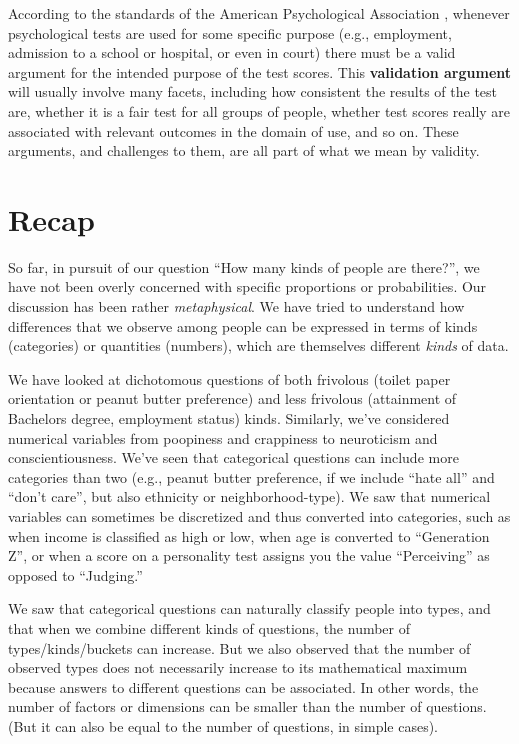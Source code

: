 \documentclass[openany]{book}
\begin{document}
According to the standards of the American Psychological Association \citep{american1999}, whenever psychological tests are used for some specific purpose (e.g., employment, admission to a school or hospital, or even in court) there must be a valid argument for the intended purpose of the test scores. This \textbf{validation argument} will usually involve many facets, including how consistent the results of the test are, whether it is a fair test for all groups of people, whether test scores really are associated with relevant outcomes in the domain of use, and so on. These arguments, and challenges to them, are all part of what we mean by validity.

\hypertarget{recap-1}{%
\section*{Recap}\label{recap-1}}

So far, in pursuit of our question ``How many kinds of people are there?'', we have not been overly concerned with specific proportions or probabilities. Our discussion has been rather \emph{metaphysical}. We have tried to understand how differences that we observe among people can be expressed in terms of kinds (categories) or quantities (numbers), which are themselves different \emph{kinds} of data.

We have looked at dichotomous questions of both frivolous (toilet paper orientation or peanut butter preference) and less frivolous (attainment of Bachelors degree, employment status) kinds. Similarly, we've considered numerical variables from poopiness and crappiness to neuroticism and conscientiousness. We've seen that categorical questions can include more categories than two (e.g., peanut butter preference, if we include ``hate all'' and ``don't care'', but also ethnicity or neighborhood-type). We saw that numerical variables can sometimes be discretized and thus converted into categories, such as when income is classified as high or low, when age is converted to ``Generation Z'', or when a score on a personality test assigns you the value ``Perceiving'' as opposed to ``Judging.''

We saw that categorical questions can naturally classify people into types, and that when we combine different kinds of questions, the number of types/kinds/buckets can increase. But we also observed that the number of observed types does not necessarily increase to its mathematical maximum because answers to different questions can be associated. In other words, the number of factors or dimensions can be smaller than the number of questions. (But it can also be equal to the number of questions, in simple cases).
\end{document}
